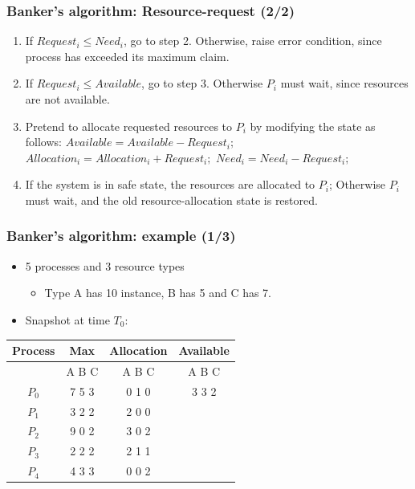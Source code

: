 \documentclass[CJKutf8,xcolor=pdftex,dvipsnames,table]{beamer}
\begin{document}
\begin{CJK*}{UTF8}{song}
  \begin{frame}
  \frametitle{Banker's algorithm: Resource-request (2/2)} \pause
  \begin{enumerate}
  \item{If $Request_i \leq Need_i$, go to step 2. Otherwise, raise error condition, since process has exceeded its maximum claim.} \pause
  \item{If $Request_i \leq Available$, go to step 3.  Otherwise $P_i$ must wait, since resources are not available.} \pause
  \item{Pretend to allocate requested resources to $P_i$ by modifying the state as follows: \newline \pause
      $Available = Available - Request_i;$ \newline \pause
      $Allocation_i = Allocation_i + Request_i;$ \newline \pause
      $Need_i = Need_i - Request_i;$ \newline \pause
    }
  \item{If the system is in safe state, the resources are allocated to $P_i$; \newline \pause
      Otherwise $P_i$ must wait, and the old resource-allocation state is restored.
    }
  \end{enumerate}
  \end{frame}

  \begin{frame}
  \frametitle{Banker's algorithm: example (1/3)} \pause
  \begin{itemize}
  \item{5 processes and 3 resource types} \pause
    \begin{itemize}
    \item{Type A has 10 instance, B has 5 and C has 7.} \pause
    \end{itemize}
  \item{Snapshot at time $T_0$:} \pause
  \end{itemize}
  \begin{tabular}{cccc}
    Process & Max   & Allocation & Available\\
    \hline
            & A B C & A B C      & A B C\\
    $P_0$   & 7 5 3 & 0 1 0      & 3 3 2\\
    $P_1$   & 3 2 2 & 2 0 0      &      \\
    $P_2$   & 9 0 2 & 3 0 2      &      \\
    $P_3$   & 2 2 2 & 2 1 1      &      \\
    $P_4$   & 4 3 3 & 0 0 2      &      \\
  \end{tabular}
  \end{frame}


\end{CJK*}
\end{document}
